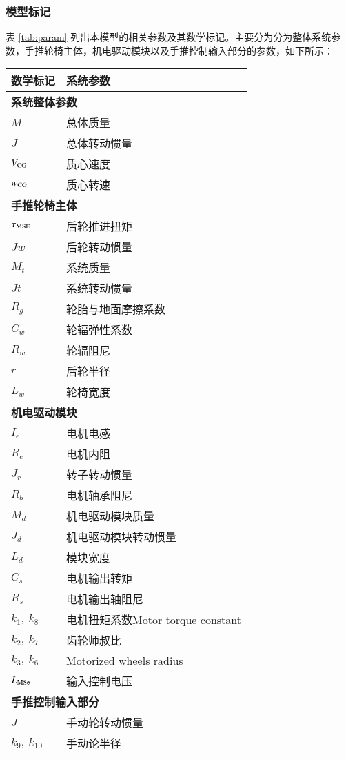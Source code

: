 \subsubsection{模型标记}

表 \ref{tab:param} 列出本模型的相关参数及其数学标记。主要分为分为整体系统参数，手推轮椅主体，机电驱动模块以及手推控制输入部分的参数，如下所示：

\begin{table}[htpb]
\caption{系统主要参数及其数学标记}\label{tab:param}
\begin{longtable}{l|l}
	\toprule
	\textbf{数学标记} & \textbf{系统参数}\\
	\midrule
	\endhead
	\multicolumn{2}{l}{\textbf{系统整体参数}} \\ %
	\midrule
	$ M $ & 总体质量\\
	$ J $ & 总体转动惯量\\
	$ V_{\rm{CG}} $ & 质心速度\\
	$ w_{\rm{CG}} $ & 质心转速\\
	\midrule
	\multicolumn{2}{l}{\textbf{手推轮椅主体}} \\
	\midrule
	$ \tau_{\rm{MSE}} $ & 后轮推进扭矩 \\
	$J w$ & 后轮转动惯量\\
	$ M_t $ & 系统质量\\
	$J t$ & 系统转动惯量\\
	$R_g$ & 轮胎与地面摩擦系数\\
	$ C_w $ & 轮辐弹性系数\\
	$R_w$ & 轮辐阻尼\\
	$ r $ & 后轮半径\\
	$ L_w $ & 轮椅宽度\\
	\midrule
	\multicolumn{2}{l}{\textbf{机电驱动模块}} \\
	\midrule
	$ I_e $ & 电机电感\\
	$ R_e $ & 电机内阻\\
	$ J_r $ & 转子转动惯量\\
	$ R_b $ & 电机轴承阻尼\\
	$ M_d $ & 机电驱动模块质量\\
	$ J_d $ & 机电驱动模块转动惯量\\
	$ L_d $ & 模块宽度\\
	$C_s $ & 电机输出转矩\\
	$ R_s $ & 电机输出轴阻尼\\
	$ k_1,\ k_8 $ & 电机扭矩系数Motor torque constant\\
	$ k_2,\ k_7 $ & 齿轮师叔比\\
	$ k_3,\ k_6 $ & Motorized wheels radius\\
	$ L_{\rm{MSe}} $ & 输入控制电压\\
	\midrule
	\multicolumn{2}{l}{\textbf{手推控制输入部分}}\\
	\midrule
	$ J $ & 手动轮转动惯量\\
	$ k_9,\ k_{10} $ & 手动论半径\\
	\bottomrule
\end{longtable}
\end{table}